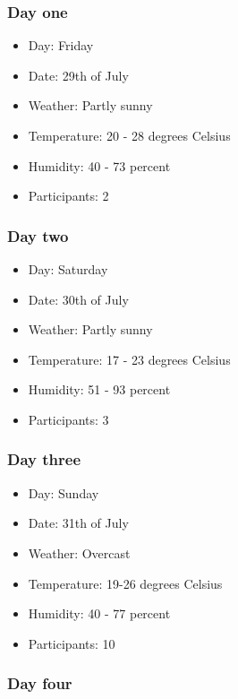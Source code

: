 \subsubsection{Day one}

\begin{itemize}
    \item Day: Friday 
    \item Date: 29th of July
    \item Weather: Partly sunny
    \item Temperature: 20 - 28 degrees Celsius
    \item Humidity: 40 - 73 percent
    \item Participants: 2
\end{itemize}

\subsubsection{Day two}

\begin{itemize}
    \item Day: Saturday 
    \item Date: 30th of July
    \item Weather: Partly sunny
    \item Temperature: 17 - 23 degrees Celsius
    \item Humidity: 51 - 93 percent
    \item Participants: 3
\end{itemize}

\subsubsection{Day three}

\begin{itemize}
    \item Day: Sunday 
    \item Date: 31th of July
    \item Weather: Overcast
    \item Temperature: 19-26 degrees Celsius
    \item Humidity: 40 - 77 percent
    \item Participants: 10
\end{itemize}

\subsubsection{Day four}

